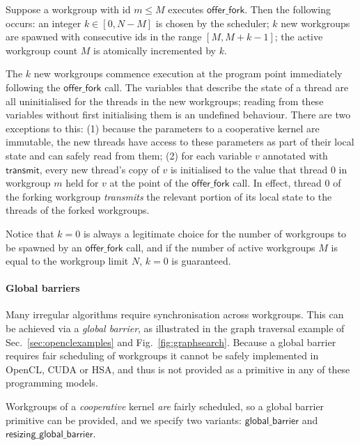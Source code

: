 \documentclass[numbers,nocopyrightspace,10pt]{sigplanconf}
\newcommand{\myfig}{Fig.~}
\newcommand{\mysec}{Sec.~}
\newcommand{\transmit}{\mathsf{transmit}}
\newcommand{\offerfork}{\mathsf{offer\_fork}}
\newcommand{\globalbarrier}{\mathsf{global\_barrier}}
\newcommand{\resizingglobalbarrier}{\mathsf{resizing\_global\_barrier}}
\begin{document}
Suppose a workgroup with id $m\leq M$ executes $\offerfork$.  Then the following occurs: an
integer $k \in [0, N-M]$ is chosen by the scheduler;
$k$ new workgroups are spawned with consecutive ids in the range $[M,
  M+k-1]$; the active workgroup count $M$ is atomically incremented by $k$.

The $k$ new workgroups commence execution at the program point
immediately following the $\offerfork$ call.  The variables that
describe the state of a thread are all uninitialised for the threads
in the new workgroups; reading from these variables without first
initialising them is an undefined behaviour.  There are two exceptions
to this: (1) because the parameters to a cooperative kernel are
immutable, the new threads have access to these parameters as part of
their local state and can safely read from them; (2) for each variable
$v$ annotated with $\transmit$, every new thread's copy of $v$ is
initialised to the value that thread 0 in workgroup $m$ held for $v$
at the point of the $\offerfork$ call.
%
In effect, thread 0 of the forking workgroup \emph{transmits} the relevant
portion of its local state to the threads of the forked workgroups.


Notice that $k=0$ is always a legitimate choice for the number of
workgroups to be spawned by an $\offerfork$ call, and if the number of
active workgroups $M$ is equal to the workgroup limit $N$, $k=0$ is
guaranteed.

\paragraph{Global barriers}

Many irregular algorithms require synchronisation across workgroups.
This can be achieved via a \emph{global barrier}, as illustrated in the graph traversal example of \mysec\ref{sec:openclexamples} and \myfig\ref{fig:graphsearch}.
Because a global barrier requires fair scheduling of workgroups it cannot be safely implemented in OpenCL, CUDA or HSA, and thus is not provided as a primitive in any of these programming models.

Workgroups of a \emph{cooperative} kernel \emph{are} fairly scheduled, so a
global barrier primitive can be provided, and we specify two variants: $\globalbarrier$
and $\resizingglobalbarrier$.
\end{document}
